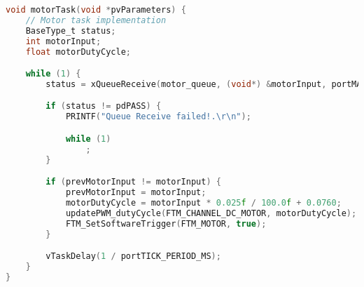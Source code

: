 \begin{lstlisting}[language=c,caption=Motor Task, label=list:motor]
void motorTask(void *pvParameters) {
    // Motor task implementation
    BaseType_t status;
    int motorInput;
    float motorDutyCycle;

    while (1) {
        status = xQueueReceive(motor_queue, (void*) &motorInput, portMAX_DELAY);

        if (status != pdPASS) {
            PRINTF("Queue Receive failed!.\r\n");

            while (1)
                ;
        }

        if (prevMotorInput != motorInput) {
            prevMotorInput = motorInput;
            motorDutyCycle = motorInput * 0.025f / 100.0f + 0.0760;
            updatePWM_dutyCycle(FTM_CHANNEL_DC_MOTOR, motorDutyCycle);
            FTM_SetSoftwareTrigger(FTM_MOTOR, true);
        }

        vTaskDelay(1 / portTICK_PERIOD_MS);
    }
}
\end{lstlisting}
